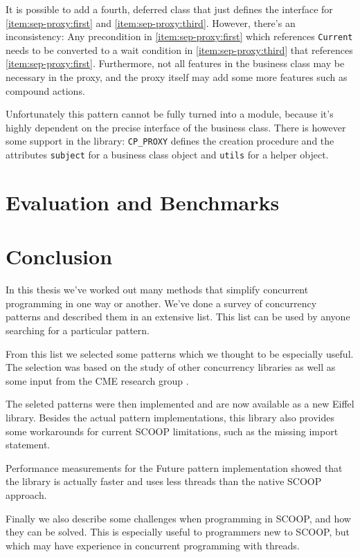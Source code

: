 \documentclass[a4paper,10pt]{article}
\newcommand{\todoref}{\todo{ref}}
\begin{document}
It is possible to add a fourth, deferred class that just defines the interface for \ref{item:sep-proxy:first} and \ref{item:sep-proxy:third}.
However, there's an inconsistency: 
Any precondition in \ref{item:sep-proxy:first} which references \lstinline!Current! needs to be converted to a wait condition in \ref{item:sep-proxy:third} that references \ref{item:sep-proxy:first}.
Furthermore, not all features in the business class may be necessary in the proxy, and the proxy itself may add some more features such as compound actions.

Unfortunately this pattern cannot be fully turned into a module, because it's highly dependent on the precise interface of the business class.
There is however some support in the library: 
\lstinline!CP_PROXY! defines the creation procedure and the attributes \lstinline!subject! for a business class object and \lstinline!utils! for a helper object.





\section{Evaluation and Benchmarks}


\section{Conclusion}

In this thesis we've worked out many methods that simplify concurrent programming in one way or another.
We've done a survey of concurrency patterns and described them in an extensive list.
This list can be used by anyone searching for a particular pattern.

From this list we selected some patterns which we thought to be especially useful.
The selection was based on the study of other concurrency libraries as well as some input from the CME research group \todoref.

The seleted patterns were then implemented and are now available as a new Eiffel library.
Besides the actual pattern implementations, this library also provides some workarounds for current SCOOP limitations, such as the missing import statement.

Performance measurements for the Future pattern implementation showed that the library is actually faster and uses less threads than the native SCOOP approach.

Finally we also describe some challenges when programming in SCOOP, and how they can be solved.
This is especially useful to programmers new to SCOOP, but which may have experience in concurrent programming with threads.
\end{document}

